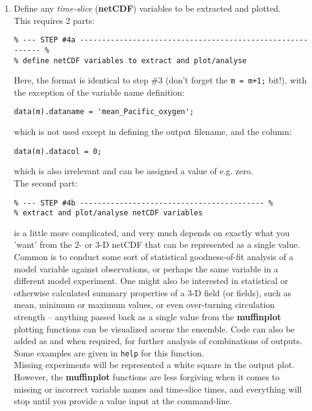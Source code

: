 \begin{enumerate}
\vspace{2mm}
\item Define any \textit{time-slice} (\textbf{netCDF}) variables to be extracted and plotted.
\vspace{1mm}
\\This requires 2 parts:
\vspace{1mm}
\vspace{-1mm}\small\begin{verbatim}
% --- STEP #4a ---------------------------------------------------------- %
% define netCDF variables to extract and plot/analyse
\end{verbatim}\normalsize\vspace{-1mm}
Here, the format is identical to step \#3 (don't forget the \texttt{m = m+1;} bit!), with the exception of the variable name definition:
\vspace{-1mm}\small\begin{verbatim}
data(m).dataname = 'mean_Pacific_oxygen';
\end{verbatim}\normalsize\vspace{-1mm}
which is not used except in defining the output filename, and the column:
\vspace{-1mm}\small\begin{verbatim}
data(m).datacol = 0;
\end{verbatim}\normalsize\vspace{-1mm}
which is also irrelevant and can be assigned a value of e.g. zero.
\vspace{1mm}
\\The second part:
\vspace{-1mm}\small\begin{verbatim}
% --- STEP #4b ------------------------------------------ %
% extract and plot/analyse netCDF variables 
\end{verbatim}\normalsize\vspace{-1mm}
is a little more complicated, and very much depends on exactly what you 'want' from the 2- or 3-D netCDF that can be represented as a single value.
\vspace{1mm}
\\Common is to conduct some sort of statistical goodness-of-fit analysis of a model variable against observations, or perhaps the same variable in a different model experiment. One might also be interested in statistical or otherwise calculated summary properties of a 3-D field (or fields), such as mean, minimum or maximum values, or even over-turning circulation strength -- anything passed back as a single value from the \textbf{muffinplot} plotting functions can be visualized acorns the ensemble. Code can also be added as and when required, for further analysis of combinations of outputs.
\\Some examples are given in \texttt{help} for this function.
\\Missing experiments will be represented a white square in the output plot. However, the \textbf{muffinplot} functions are less forgiving when it comes to missing or incorrect variable names and time-slice times, and everything will stop until you provide a value input at the command-line.


\end{enumerate}
